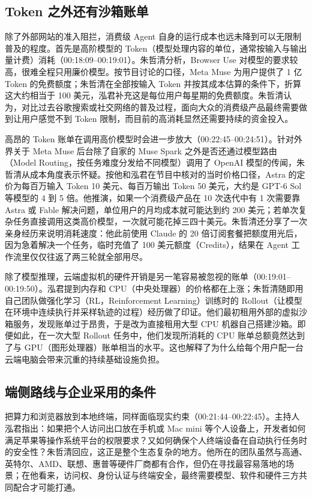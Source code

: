 \documentclass[UTF8,a4paper,11pt,fontset=fandol]{ctexart}
\begin{document}
\subsection{Token 之外还有沙箱账单}
除了外部网站的准入阻拦，消费级 Agent 自身的运行成本也远未降到可以无限制普及的程度。首先是高阶模型的 Token（模型处理内容的单位，通常按输入与输出量计费）消耗（00:18:09–00:19:01）。朱哲清分析，Browser Use 对模型的要求较高，很难全程只用廉价模型。按节目讨论的口径，Meta Muse 为用户提供了 1 亿 Token 的免费额度；朱哲清在全部按输入 Token 并按其成本估算的条件下，折算这大约相当于 100 美元，泓君补充这是每位用户每星期的免费额度。朱哲清认为，对比过去谷歌搜索或社交网络的普及过程，面向大众的消费级产品最终需要做到让用户感觉不到 Token 限制，而目前的高消耗显然还需要持续的资金投入。

高昂的 Token 账单在调用高价模型时会进一步放大（00:22:45–00:24:51）。针对外界关于 Meta Muse 后台除了自家的 Muse Spark 之外是否还通过模型路由（Model Routing，按任务难度分发给不同模型）调用了 OpenAI 模型的传闻，朱哲清从成本角度表示怀疑。按他和泓君在节目中核对的当时价格口径，Astra 的定价为每百万输入 Token 10 美元、每百万输出 Token 50 美元，大约是 GPT-6 Sol 等模型的 4 到 5 倍。他推演，如果一个消费级产品在 10 次迭代中有 1 次需要靠 Astra 或 Fable 解决问题，单位用户的月均成本就可能达到约 200 美元；若单次复杂任务直接调用这类高价模型，一次就可能花掉三四十美元。朱哲清还分享了一次亲身经历来说明消耗速度：他此前使用 Claude 的 20 倍订阅套餐把额度用光后，因为急着解决一个任务，临时充值了 100 美元额度（Credits），结果在 Agent 工作流里仅仅往返了两三轮就全部用尽。

除了模型推理，云端虚拟机的硬件开销是另一笔容易被忽视的账单（00:19:01–00:19:50）。泓君提到内存和 CPU（中央处理器）的价格都在上涨；朱哲清随即用自己团队做强化学习（RL，Reinforcement Learning）训练时的 Rollout（让模型在环境中连续执行并采样轨迹的过程）经历做了印证。他们最初租用外部的虚拟沙箱服务，发现账单过于昂贵，于是改为直接租用大型 CPU 机器自己搭建沙箱。即便如此，在一次大型 Rollout 任务中，他们发现所消耗的 CPU 账单总额竟然达到了与 GPU（图形处理器）账单相当的水平。这也解释了为什么给每个用户配一台云端电脑会带来沉重的持续基础设施负担。

\subsection{端侧路线与企业采用的条件}
把算力和浏览器放到本地终端，同样面临现实约束（00:21:44–00:22:45）。主持人泓君指出：如果把个人访问出口放在手机或 Mac mini 等个人设备上，开发者如何满足苹果等操作系统平台的权限要求？又如何确保个人终端设备在自动执行任务时的安全性？朱哲清回应，这正是整个生态复杂的地方。他所在的团队虽然与高通、英特尔、AMD、联想、惠普等硬件厂商都有合作，但仍在寻找最容易落地的场景；在他看来，访问权、身份认证与终端安全，最终需要模型、软件和硬件三方共同配合才可能打通。
\end{document}
